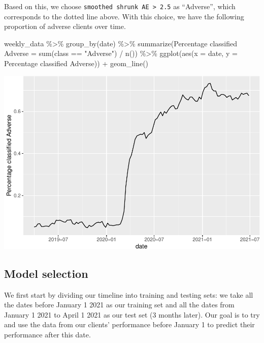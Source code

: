 \documentclass[
]{article}
\newenvironment{Shaded}{\begin{snugshade}}{\end{snugshade}}
\newcommand{\AttributeTok}[1]{\textcolor[rgb]{0.77,0.63,0.00}{#1}}
\newcommand{\FunctionTok}[1]{\textcolor[rgb]{0.00,0.00,0.00}{#1}}
\newcommand{\NormalTok}[1]{#1}
\newcommand{\OtherTok}[1]{\textcolor[rgb]{0.56,0.35,0.01}{#1}}
\newcommand{\SpecialCharTok}[1]{\textcolor[rgb]{0.00,0.00,0.00}{#1}}
\newcommand{\StringTok}[1]{\textcolor[rgb]{0.31,0.60,0.02}{#1}}
\begin{document}
Based on this, we choose
\texttt{smoothed\ shrunk\ AE\ \textgreater{}\ 2.5} as ``Adverse'', which
corresponds to the dotted line above. With this choice, we have the
following proportion of adverse clients over time.

\begin{Shaded}
\begin{Highlighting}[]
\NormalTok{weekly\_data }\SpecialCharTok{\%\textgreater{}\%}
  \FunctionTok{group\_by}\NormalTok{(date) }\SpecialCharTok{\%\textgreater{}\%}
  \FunctionTok{summarize}\NormalTok{(}\StringTok{\textasciigrave{}}\AttributeTok{Percentage classified Adverse}\StringTok{\textasciigrave{}} \OtherTok{=} \FunctionTok{sum}\NormalTok{(class }\SpecialCharTok{==} \StringTok{"Adverse"}\NormalTok{) }\SpecialCharTok{/} \FunctionTok{n}\NormalTok{()) }\SpecialCharTok{\%\textgreater{}\%}
  \FunctionTok{ggplot}\NormalTok{(}\FunctionTok{aes}\NormalTok{(}\AttributeTok{x =}\NormalTok{ date, }\AttributeTok{y =} \StringTok{\textasciigrave{}}\AttributeTok{Percentage classified Adverse}\StringTok{\textasciigrave{}}\NormalTok{)) }\SpecialCharTok{+} \FunctionTok{geom\_line}\NormalTok{()}
\end{Highlighting}
\end{Shaded}

\includegraphics{figures/report/fig-unnamed-chunk-39-1.pdf}

\hypertarget{model-selection-1}{%
\subsection{Model selection}\label{model-selection-1}}

We first start by dividing our timeline into training and testing sets:
we take all the dates before January 1 2021 as our training set and all
the dates from January 1 2021 to April 1 2021 as our test set (3 months
later). Our goal is to try and use the data from our clients'
performance before January 1 to predict their performance after this
date.
\end{document}
